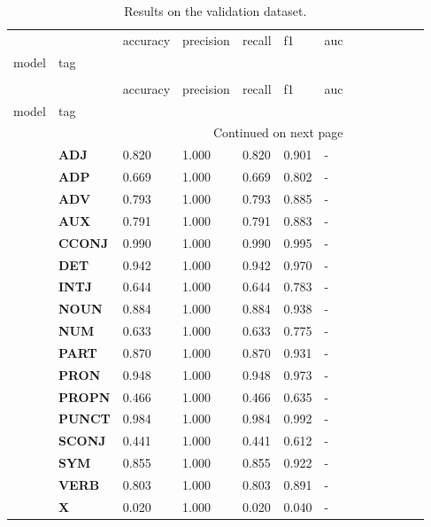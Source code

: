 \begin{longtable}{|l||l||l||l||l||l||l||l||l||l||l||l||l|}
\caption{Results on the validation dataset.} \label{tab::ex_3_valid} \\
\toprule
 &  & accuracy & precision & recall & f1 & auc \\
model & tag &  &  &  &  &  \\
\midrule
\endfirsthead
\caption[]{Results on the validation dataset.} \\
\toprule
 &  & accuracy & precision & recall & f1 & auc \\
model & tag &  &  &  &  &  \\
\midrule
\endhead
\midrule
\multicolumn{7}{r}{Continued on next page} \\
\midrule
\endfoot
\bottomrule
\endlastfoot
\multirow[t]{18}{*}{\textbf{Baseline}} & \textbf{ADJ} & 0.820 & 1.000 & 0.820 & 0.901 & - \\
\textbf{} & \textbf{ADP} & 0.669 & 1.000 & 0.669 & 0.802 & - \\
\textbf{} & \textbf{ADV} & 0.793 & 1.000 & 0.793 & 0.885 & - \\
\textbf{} & \textbf{AUX} & 0.791 & 1.000 & 0.791 & 0.883 & - \\
\textbf{} & \textbf{CCONJ} & 0.990 & 1.000 & 0.990 & 0.995 & - \\
\textbf{} & \textbf{DET} & 0.942 & 1.000 & 0.942 & 0.970 & - \\
\textbf{} & \textbf{INTJ} & 0.644 & 1.000 & 0.644 & 0.783 & - \\
\textbf{} & \textbf{NOUN} & 0.884 & 1.000 & 0.884 & 0.938 & - \\
\textbf{} & \textbf{NUM} & 0.633 & 1.000 & 0.633 & 0.775 & - \\
\textbf{} & \textbf{PART} & 0.870 & 1.000 & 0.870 & 0.931 & - \\
\textbf{} & \textbf{PRON} & 0.948 & 1.000 & 0.948 & 0.973 & - \\
\textbf{} & \textbf{PROPN} & 0.466 & 1.000 & 0.466 & 0.635 & - \\
\textbf{} & \textbf{PUNCT} & 0.984 & 1.000 & 0.984 & 0.992 & - \\
\textbf{} & \textbf{SCONJ} & 0.441 & 1.000 & 0.441 & 0.612 & - \\
\textbf{} & \textbf{SYM} & 0.855 & 1.000 & 0.855 & 0.922 & - \\
\textbf{} & \textbf{VERB} & 0.803 & 1.000 & 0.803 & 0.891 & - \\
\textbf{} & \textbf{X} & 0.020 & 1.000 & 0.020 & 0.040 & - \\

\end{longtable}
